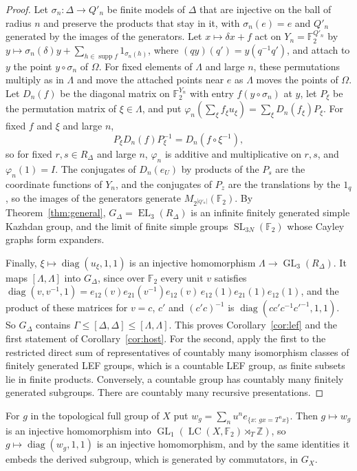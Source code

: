 \documentclass[11pt]{amsart}
\newcommand{\F}{\mathbb F}
\newcommand{\Z}{\mathbb Z}
\newcommand{\LC}{\operatorname{LC}}
\newcommand{\EL}{\operatorname{EL}}
\newcommand{\GL}{\operatorname{GL}}
\newcommand{\SL}{\operatorname{SL}}
\begin{document}
\begin{proof}
Let $\sigma_n\colon\Delta\to Q'_n$ be finite models of $\Delta$ that are
injective on the ball of radius $n$ and preserve the products that stay
in it, with $\sigma_n(e)=e$ and $Q'_n$ generated by the images of the
generators. Let $x\mapsto\delta x+f$ act on $Y_n=\F_2^{Q'_n}$ by
$y\mapsto\sigma_n(\delta)y+\sum_{h\in\operatorname{supp}f}1_{\sigma_n(h)}$,
where $(qy)(q')=y(q^{-1}q')$, and attach to $y$ the point $y\circ\sigma_n$
of $\Omega$. For fixed elements of $\Lambda$ and large $n$, these
permutations multiply as in $\Lambda$ and move the attached points near
$e$ as $\Lambda$ moves the points of $\Omega$. Let $D_n(f)$ be the diagonal
matrix on $\F_2^{Y_n}$ with entry $f(y\circ\sigma_n)$ at $y$, let $P_\xi$ be
the permutation matrix of $\xi\in\Lambda$, and put
$\varphi_n(\sum_\xi f_\xi u_\xi)=\sum_\xi D_n(f_\xi)P_\xi$. For fixed $f$ and
$\xi$ and large $n$,
\[
  P_\xi D_n(f)P_\xi^{-1}=D_n(f\circ\xi^{-1}),
\]
so for fixed $r,s\in R_\Delta$ and large $n$, $\varphi_n$ is additive and
multiplicative on $r,s$, and $\varphi_n(1)=I$. The conjugates of
$D_n(e_U)$ by products of the $P_s$ are the coordinate functions of $Y_n$,
and the conjugates of $P_z$ are the translations by the $1_q$, so the
images of the generators generate $M_{2^{|Q'_n|}}(\F_2)$. By
Theorem~\ref{thm:general}, $G_\Delta=\EL_3(R_\Delta)$ is an infinite
finitely generated simple Kazhdan group, and the limit of finite simple
groups $\SL_{3N}(\F_2)$ whose Cayley graphs form expanders.

Finally, $\xi\mapsto\operatorname{diag}(u_\xi,1,1)$ is an injective
homomorphism $\Lambda\to\GL_3(R_\Delta)$. It maps $[\Lambda,\Lambda]$ into
$G_\Delta$, since over $\F_2$ every unit $v$ satisfies
$\operatorname{diag}(v,v^{-1},1)=e_{12}(v)e_{21}(v^{-1})e_{12}(v)\,e_{12}(1)e_{21}(1)e_{12}(1)$,
and the product of these matrices for $v=c$, $c'$ and $(c'c)^{-1}$ is
$\operatorname{diag}(cc'c^{-1}c'^{-1},1,1)$. So $G_\Delta$ contains
$\Gamma\le[\Delta,\Delta]\le[\Lambda,\Lambda]$. This proves
Corollary~\ref{cor:lef} and the first statement of
Corollary~\ref{cor:host}. For the second, apply the first to the
restricted direct sum of representatives of countably many isomorphism
classes of finitely generated LEF groups, which is a countable LEF group,
as finite subsets lie in finite products. Conversely, a countable group
has countably many finitely generated subgroups. There are countably many
recursive presentations.
\end{proof}

For $g$ in the topological full group of $X$ put
$w_g=\sum_nu^ne_{\{x:\,gx=T^nx\}}$. Then $g\mapsto w_g$ is an injective
homomorphism into $\GL_1(\LC(X,\F_2)\rtimes_T\Z)$, so
$g\mapsto\operatorname{diag}(w_g,1,1)$ is an injective homomorphism, and by
the same identities it embeds the derived subgroup, which is generated by
commutators, in $G_X$.
\end{document}
